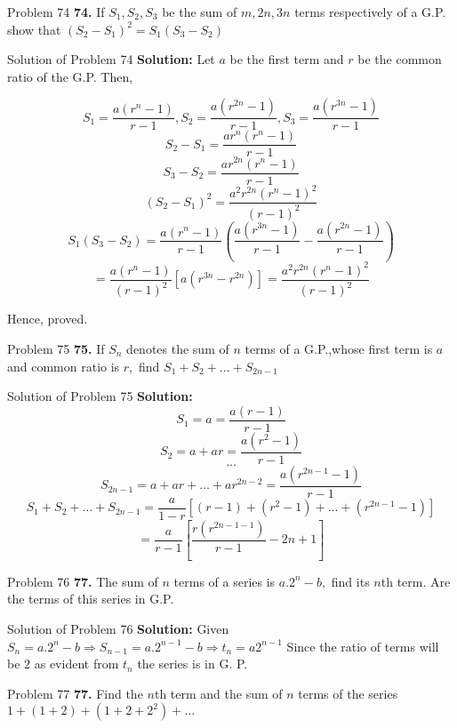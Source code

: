 \documentclass[aspectratio=1610,8pt]{beamer}
\begin{document}
\begin{frame}{Problem 74}
  \textbf{74.} If $S_1, S_2, S_3$ be the sum of $m, 2n, 3n$ terms respectively of a G.P. show that $(S_2 - S_1)^2 = S_1(S_3 - S_2)$
\end{frame}
\begin{frame}{Solution of Problem 74}
  \textbf{Solution:} Let $a$ be the first term and $r$ be the common ratio of the G.P. Then,

  $$S_1 = \frac{a(r^n - 1)}{r - 1}, S_2 = \frac{a(r^{2n} - 1)}{r - 1}, S_3 = \frac{a(r^{3n} - 1)}{r - 1}$$
  $$S_2 - S_1 = \frac{ar^n(r^n - 1)}{r - 1}$$
  $$S_3 - S_2 = \frac{ar^{2n}(r^n - 1)}{r - 1}$$
  $$(S_2 - S_1)^2 = \frac{a^2r^{2n}(r^n - 1)^2}{(r - 1)^2}$$
  $$S_1(S_3 - S_2) = \frac{a(r^n - 1)}{r - 1}\left(\frac{a(r^{3n} - 1)}{r - 1}- \frac{a(r^{2n} - 1)}{r - 1}\right)$$
  $$= \frac{a(r^n - 1)}{(r - 1)^2}[a(r^{3n} - r^{2n})] = \frac{a^2r^{2n}(r^n - 1)^2}{(r - 1)^2}$$

  Hence, proved.
\end{frame}
\begin{frame}{Problem 75}
  \textbf{75.} If $S_n$ denotes the sum of $n$ terms of a G.P.,whose first term is $a$ and common ratio is $r,$ find $S_1 + S_2 +  \ldots + S_{2n - 1}$
\end{frame}
\begin{frame}{Solution of Problem 75}
  \textbf{Solution:} $$S_1 = a = \frac{a(r - 1)}{r - 1}$$
  $$S_2 = a + ar = \frac{a(r^2 - 1)}{r - 1}$$
  $$\ldots$$
  $$S_{2n - 1} = a + ar + \ldots+ ar^{2n- 2} = \frac{a(r^{2n- 1} - 1)}{r - 1}$$
  $$S_1 + S_2 + \ldots + S_{2n - 1} = \frac{a}{1- r}\left[(r - 1) + (r^2 - 1) + \ldots + (r^{2n - 1} - 1)\right]$$
  $$ = \frac{a}{r - 1}\left[\frac{r(r^{2n - 1 - 1})}{r - 1} - 2n + 1\right]$$
\end{frame}
\begin{frame}{Problem 76}
  \textbf{77.} The sum of $n$ terms of a series is $a.2^n - b,$ find its $n$th term. Are the terms of this series in G.P.
\end{frame}
\begin{frame}{Solution of Problem 76}
  \textbf{Solution:} Given $S_n = a.2^n - b \Rightarrow S_{n - 1} = a.2^{n - 1} - b\Rightarrow t_n= a2^{n - 1}$ Since the ratio of
  terms will be $2$ as evident from $t_n$ the series is in G. P.
\end{frame}
\begin{frame}{Problem 77}
  \textbf{77.} Find the $n$th term and the sum of $n$ terms of the series $1 + (1 + 2) + (1 + 2 + 2^2) + \ldots$
\end{frame}
\end{document}
